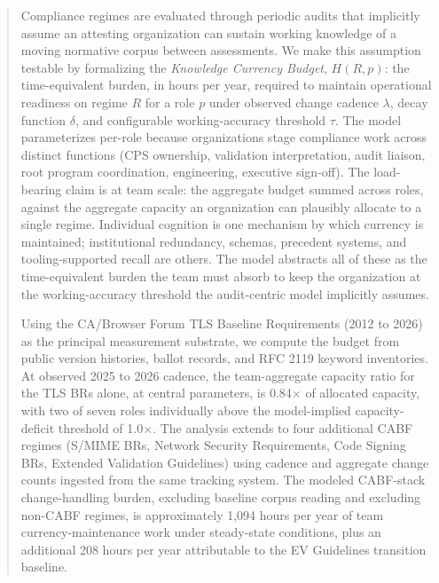 \documentclass[11pt,letterpaper]{article}
\begin{document}
\begin{abstract}
\noindent
Compliance regimes are evaluated through periodic audits that implicitly assume an attesting organization can sustain working knowledge of a moving normative corpus between assessments. We make this assumption testable by formalizing the \textit{Knowledge Currency Budget}, $H(R, p)$: the time-equivalent burden, in hours per year, required to maintain operational readiness on regime $R$ for a role $p$ under observed change cadence $\lambda$, decay function $\delta$, and configurable working-accuracy threshold $\tau$. The model parameterizes per-role because organizations stage compliance work across distinct functions (CPS ownership, validation interpretation, audit liaison, root program coordination, engineering, executive sign-off). The load-bearing claim is at team scale: the aggregate budget summed across roles, against the aggregate capacity an organization can plausibly allocate to a single regime. Individual cognition is one mechanism by which currency is maintained; institutional redundancy, schemas, precedent systems, and tooling-supported recall are others. The model abstracts all of these as the time-equivalent burden the team must absorb to keep the organization at the working-accuracy threshold the audit-centric model implicitly assumes.

Using the CA/Browser Forum TLS Baseline Requirements (2012 to 2026) as the principal measurement substrate, we compute the budget from public version histories, ballot records, and RFC 2119 keyword inventories. At observed 2025 to 2026 cadence, the team-aggregate capacity ratio for the TLS BRs alone, at central parameters, is 0.84$\times$ of allocated capacity, with two of seven roles individually above the model-implied capacity-deficit threshold of 1.0$\times$. The analysis extends to four additional CABF regimes (S/MIME BRs, Network Security Requirements, Code Signing BRs, Extended Validation Guidelines) using cadence and aggregate change counts ingested from the same tracking system. The modeled CABF-stack change-handling burden, excluding baseline corpus reading and excluding non-CABF regimes, is approximately 1{,}094 hours per year of team currency-maintenance work under steady-state conditions, plus an additional 208 hours per year attributable to the EV Guidelines transition baseline.


\end{abstract}
\end{document}
